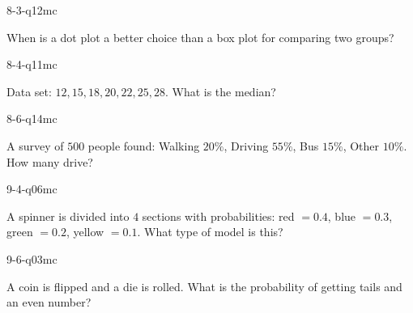 \begin{practiceQuestion}{8-3-q12}{mc}
\begin{questionText}
When is a dot plot a better choice than a box plot for comparing two groups?
\end{questionText}
\end{practiceQuestion}

\begin{practiceQuestion}{8-4-q11}{mc}
\begin{questionText}
Data set: $12, 15, 18, 20, 22, 25, 28$. What is the median?
\end{questionText}
\end{practiceQuestion}

\begin{practiceQuestion}{8-6-q14}{mc}
\begin{questionText}
A survey of $500$ people found: Walking $20\%$, Driving $55\%$, Bus $15\%$, Other $10\%$. How many drive?
\end{questionText}
\end{practiceQuestion}

\begin{practiceQuestion}{9-4-q06}{mc}
\begin{questionText}
A spinner is divided into $4$ sections with probabilities: red $= 0.4$, blue $= 0.3$, green $= 0.2$, yellow $= 0.1$. What type of model is this?
\end{questionText}
\end{practiceQuestion}

\begin{practiceQuestion}{9-6-q03}{mc}
\begin{questionText}
A coin is flipped and a die is rolled. What is the probability of getting tails and an even number?
\end{questionText}
\end{practiceQuestion}


